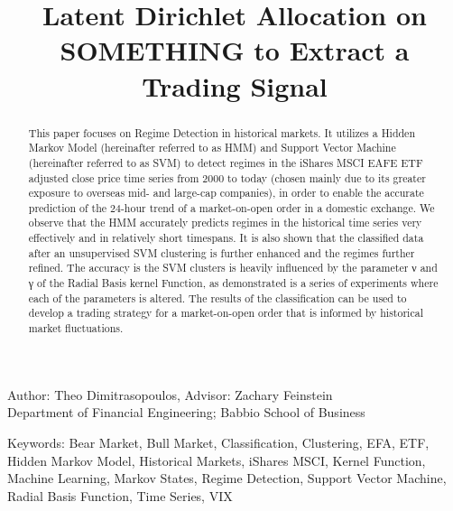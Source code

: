 \documentclass[]{hdsr}
\begin{document}

\begin{center}
  \title{Latent Dirichlet Allocation on SOMETHING to Extract a Trading Signal}
  \maketitle

Author: Theo Dimitrasopoulos\upstairs{\affilone*}, Advisor: Zachary Feinstein\upstairs{\affilone**}\\
{\small \upstairs{\affilone}Department of Financial Engineering; Babbio School of Business}

\vspace{0.15in}

\begin{abstract}
This paper focuses on Regime Detection in historical markets. It utilizes a Hidden Markov Model (hereinafter referred to as HMM) and Support Vector Machine (hereinafter referred to as SVM) to detect regimes in the iShares MSCI EAFE ETF adjusted close price time series from 2000 to today (chosen mainly due to its greater exposure to overseas mid- and large-cap companies), in order to enable the accurate prediction of the 24-hour trend of a market-on-open order in a domestic exchange. We observe that the HMM accurately predicts regimes in the historical time series very effectively and in relatively short timespans. It is also shown that the classified data after an unsupervised SVM clustering is further enhanced and the regimes further refined. The accuracy is the SVM clusters is heavily influenced by the parameter ν and γ of the Radial Basis kernel Function, as demonstrated is a series of experiments where each of the parameters is altered. The results of the classification can be used to develop a trading strategy for a market-on-open order that is informed by historical market fluctuations.
\end{abstract}
\end{center}

\vspace*{0.15in}
\small
Keywords: {Bear Market, Bull Market, Classification, Clustering, EFA, ETF, Hidden Markov Model, Historical Markets, iShares MSCI, Kernel Function, Machine Learning, Markov States, Regime Detection, Support Vector Machine, Radial Basis Function, Time Series, VIX}
\end{document}

